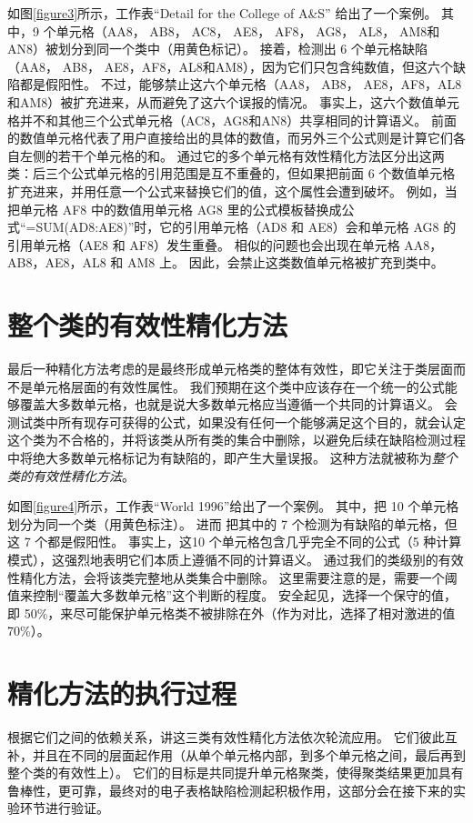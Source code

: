 如图\ref{figure3}所示，工作表“Detail for the College of A\&S” 给出了一个案例。
其中，9 个单元格（AA8， AB8， AC8， AE8， AF8， AG8， AL8， AM8和AN8）被\cu 划分到同一个类中（用黄色标记）。
接着，\cu 检测出 6 个单元格缺陷（AA8， AB8， AE8，AF8，AL8和AM8），因为它们只包含纯数值，但这六个缺陷都是假阳性。
不过，\wa 能够禁止这六个单元格（AA8， AB8， AE8，AF8，AL8和AM8）被扩充进来，从而避免了这六个误报的情况。
事实上，这六个数值单元格并不和其他三个公式单元格（AC8，AG8和AN8）共享相同的计算语义。
前面的数值单元格代表了用户直接给出的具体的数值，而另外三个公式则是计算它们各自左侧的若干个单元格的和。
\wa 通过它的多个单元格有效性精化方法区分出这两类：后三个公式单元格的引用范围是互不重叠的，但如果把前面 6 个数值单元格扩充进来，并用任意一个公式来替换它们的值，这个属性会遭到破坏。
例如，当把单元格 AF8 中的数值用单元格 AG8 里的公式模板替换成公式“=SUM(AD8:AE8)”时，它的引用单元格（AD8 和 AE8）会和单元格 AG8 的引用单元格（AE8 和 AF8）发生重叠。
相似的问题也会出现在单元格 AA8，AB8，AE8，AL8 和 AM8 上。
因此，\wa 会禁止这类数值单元格被扩充到类中。

\section{整个类的有效性精化方法}



最后一种精化方法考虑的是最终形成单元格类的整体有效性，即它关注于类层面而不是单元格层面的有效性属性。
我们预期在这个类中应该存在一个统一的公式能够覆盖大多数单元格，也就是说大多数单元格应当遵循一个共同的计算语义。
\wa 会测试类中所有现存可获得的公式，如果没有任何一个能够满足这个目的，\wa 就会认定这个类为不合格的，并将该类从所有类的集合中删除，以避免后续在缺陷检测过程中将绝大多数单元格标记为有缺陷的，即产生大量误报。
这种方法就被称为\textit{整个类的有效性精化方法}。

如图\ref{figure4}所示，工作表“World 1996”给出了一个案例。
其中，\cu 把 10 个单元格划分为同一个类（用黄色标注）。
进而 \cu 把其中的 7 个检测为有缺陷的单元格，但这 7 个都是假阳性。
事实上，这10 个单元格包含几乎完全不同的公式（5 种计算模式），这强烈地表明它们本质上遵循不同的计算语义。
通过我们的类级别的有效性精化方法，\wa 会将该类完整地从类集合中删除。
这里需要注意的是，\wa 需要一个阈值来控制“覆盖大多数单元格”这个判断的程度。
安全起见，\wa 选择一个保守的值，即 50\%，来尽可能保护单元格类不被排除在外（作为对比，\ca 选择了相对激进的值70\%）。

\section{精化方法的执行过程}

根据它们之间的依赖关系，\wa 讲这三类有效性精化方法依次轮流应用。
它们彼此互补，并且在不同的层面起作用（从单个单元格内部，到多个单元格之间，最后再到整个类的有效性上）。
它们的目标是共同提升单元格聚类，使得聚类结果更加具有鲁棒性，更可靠，最终对\wa 的电子表格缺陷检测起积极作用，这部分会在接下来的实验环节进行验证。